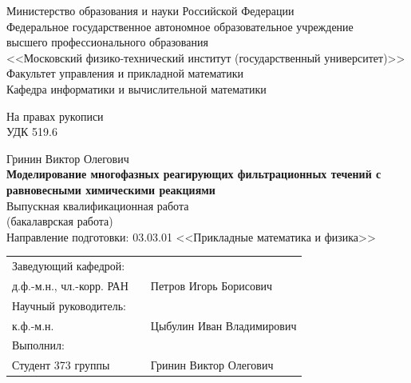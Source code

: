 \documentclass[14pt,a4paper]{extarticle}
\begin{document}
\thispagestyle{empty}


\begin{center}
	Министерство образования и науки Российской Федерации\\[6pt]
	
	Федеральное государственное автономное образовательное учреждение\\
	высшего профессионального образования\\
	<<Московский физико-технический институт (государственный университет)>>\\[6pt]
	
	Факультет управления и прикладной математики\\[6pt]
	Кафедра информатики и вычислительной математики\\[6pt]	
\end{center} 
\vspace{20mm}
\begin{flushright}
На правах рукописи\\
УДК 519.6
\end{flushright}

\begin{center}
	Гринин Виктор Олегович\\[6pt]
	
	{\large {\bf Моделирование многофазных реагирующих фильтрационных течений с равновесными химическими реакциями}}\\[6pt]
	
	Выпускная квалификационная работа\\
	(бакалаврская работа)\\
	
	Направление подготовки: 03.03.01 <<Прикладные математика и физика>>
\end{center}

\vspace{20mm}

\begin{flushleft}
	\begin{tabularx}{\textwidth}{lcl}
		Заведующий кафедрой: \\
		д.ф.-м.н., чл.-корр. РАН  & \raisebox{-3pt}{\rule{4cm}{0.5pt}} & Петров Игорь Борисович \\[5mm]
	
		Научный руководитель:\\
		к.ф.-м.н. & \raisebox{-3pt}{\rule{4cm}{0.5pt}} & Цыбулин Иван Владимирович \\[5mm]	
	
		Выполнил: \\
		Студент 373 группы  & \raisebox{-3pt}{\rule{4cm}{0.5pt}} & Гринин Виктор Олегович \\[5mm]
		
	\end{tabularx}
\end{flushleft}
\end{document}
